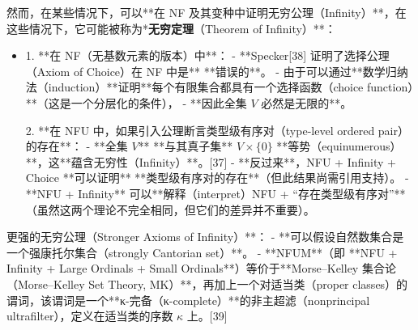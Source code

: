 然而，在某些情况下，可以**在 NF 及其变种中证明无穷公理（Infinity）**，在这些情况下，它可能被称为*\textbf{无穷定理}（Theorem of Infinity）**：

\begin{itemize}
\item 1. **在 NF（无基数元素的版本）中**：
   - **Specker[38] 证明了选择公理（Axiom of Choice）在 NF 中是** **错误的**。
   - 由于可以通过**数学归纳法（induction）**证明**每个有限集合都具有一个选择函数（choice function）**（这是一个分层化的条件），
   - **因此全集 \( V \) 必然是无限的**。

2. **在 NFU 中，如果引入公理断言类型级有序对（type-level ordered pair）的存在**：
   - **全集 \( V \)** **与其真子集** \( V \times \{0\} \) **等势（equinumerous）**，这**蕴含无穷性（Infinity）**。[37]
   - **反过来**，NFU + Infinity + Choice **可以证明** **类型级有序对的存在**（但此结果尚需引用支持）。  
   - **NFU + Infinity** 可以**解释（interpret）NFU + “存在类型级有序对”**（虽然这两个理论不完全相同，但它们的差异并不重要）。
\end{itemize}

更强的无穷公理（Stronger Axioms of Infinity）**：
   - **可以假设自然数集合是一个强康托尔集合（strongly Cantorian set）**。
   - **NFUM**（即 **NFU + Infinity + Large Ordinals + Small Ordinals**）等价于**Morse–Kelley 集合论（Morse–Kelley Set Theory, MK）**，再加上一个对适当类（proper classes）的谓词，该谓词是一个**κ-完备（κ-complete）**的非主超滤（nonprincipal ultrafilter），定义在适当类的序数 \( \kappa \) 上。[39]